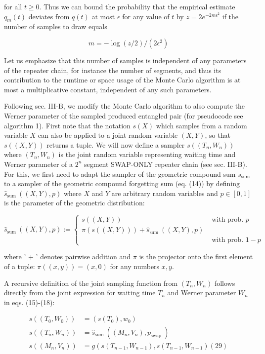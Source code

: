 \documentclass[10pt]{article}
\begin{document}
for all $t \geq 0$. Thus we can bound the probability that the empirical estimate $q_{m}(t)$ deviates from $q(t)$ at most $\epsilon$ for any value of $t$ by $z=2 e^{-2 m \epsilon^{2}}$ if the number of samples to draw equals


\begin{equation*}
m=-\log (z / 2) /\left(2 \epsilon^{2}\right) \tag{28}
\end{equation*}


Let us emphasize that this number of samples is independent of any parameters of the repeater chain, for instance the number of segments, and thus its contribution to the runtime or space usage of the Monte Carlo algorithm is at most a multiplicative constant, independent of any such parameters.

Following sec. III-B, we modify the Monte Carlo algorithm to also compute the Werner parameter of the sampled produced entangled pair (for pseudocode see algorithm 1). First note that the notation $s(X)$ which samples from a random variable $X$ can also be applied to a joint random variable $(X, Y)$, so that $s((X, Y))$ returns a tuple. We will now define a sampler $s\left(\left(T_{n}, W_{n}\right)\right)$ where $\left(T_{n}, W_{n}\right)$ is the joint random variable representing waiting time and Werner parameter of a $2^{n}$ segment SWAP-ONLY repeater chain (see sec. III-B). For this, we first need to adapt the sampler of the geometric compound sum $s_{\text {sum }}$ to a sampler of the geometric compound forgetting sum (eq. (14)) by defining $\hat{s}_{\text {sum }}((X, Y), p)$ where $X$ and $Y$ are arbitrary random variables and $p \in[0,1]$ is the parameter of the geometric distribution:

$$
\hat{s}_{\text {sum }}((X, Y), p):= \begin{cases}s((X, Y)) & \text { with prob. } p \\ \pi(s((X, Y)))+\hat{s}_{\text {sum }}((X, Y), p) \\ & \text { with prob. } 1-p\end{cases}
$$

where ' + ' denotes pairwise addition and $\pi$ is the projector onto the first element of a tuple: $\pi((x, y))=(x, 0)$ for any numbers $x, y$.

A recursive definition of the joint sampling function from $\left(T_{n}, W_{n}\right)$ follows directly from the joint expression for waiting time $T_{n}$ and Werner parameter $W_{n}$ in eqs. (15)-(18):

$$
\begin{aligned}
s\left(\left(T_{0}, W_{0}\right)\right) & =\left(s\left(T_{0}\right), w_{0}\right) \\
s\left(\left(T_{n}, W_{n}\right)\right) & =\hat{s}_{\text {sum }}\left(\left(M_{n}, V_{n}\right), p_{\text {swap }}\right) \\
s\left(\left(M_{n}, V_{n}\right)\right) & =g\left(s\left(T_{n-1}, W_{n-1}\right), s\left(T_{n-1}, W_{n-1}\right)(29)\right.
\end{aligned}
$$
\end{document}
